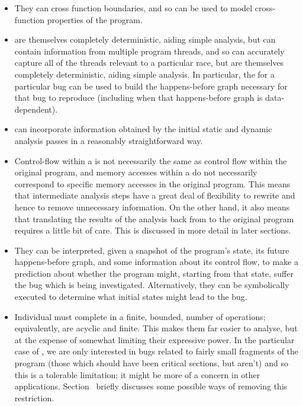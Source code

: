 \begin{itemize}
\item
  They can cross function boundaries, and so can be used to model
  cross-function properties of the program.
\item
  {\STateMachines} are themselves completely deterministic, aiding
  simple analysis, but can contain information from multiple program
  threads, and so can accurately capture all of the threads relevant
  to a particular race, but are themselves completely deterministic,
  aiding simple analysis.  In particular, the \StateMachine for a
  particular bug can be used to build the happens-before graph
  necessary for that bug to reproduce (including when that
  happens-before graph is data-dependent).
\item
  \STateMachines can incorporate information obtained by the initial
  static and dynamic analysis passes in a reasonably straightforward
  way.
\item
  Control-flow within a \StateMachine is not necessarily the same as
  control flow within the original program, and memory accesses within
  a \StateMachine do not necessarily correspond to specific memory
  accesses in the original program.  This means that intermediate
  analysis steps have a great deal of flexibility to rewrite
  \StateMachines and hence to remove unnecessary information.  On the
  other hand, it also means that translating the results of the
  analysis back from \StateMachines to the original program requires a
  little bit of care.  This is discussed in more detail in later
  sections.
\item
  They can be interpreted, given a snapshot of the program's state,
  its future happens-before graph, and some information about its
  control flow, to make a prediction about whether the program might,
  starting from that state, suffer the bug which is being
  investigated.  Alternatively, they can be symbolically executed to
  determine what initial states might lead to the bug.

\item
  Individual \StateMachines must complete in a finite, bounded, number
  of operations; equivalently, \StateMachines are acyclic and finite.
  This makes them far easier to analyse, but at the expense of
  somewhat limiting their expressive power.  In the particular case of
  \technique{}, we are only interested in bugs related to fairly small
  fragments of the program (those which should have been critical
  sections, but aren't) and so this is a tolerable limitation; it
  might be more of a concern in other applications.
  Section~ briefly discusses some possible ways of removing
  this restriction.
\end{itemize}


